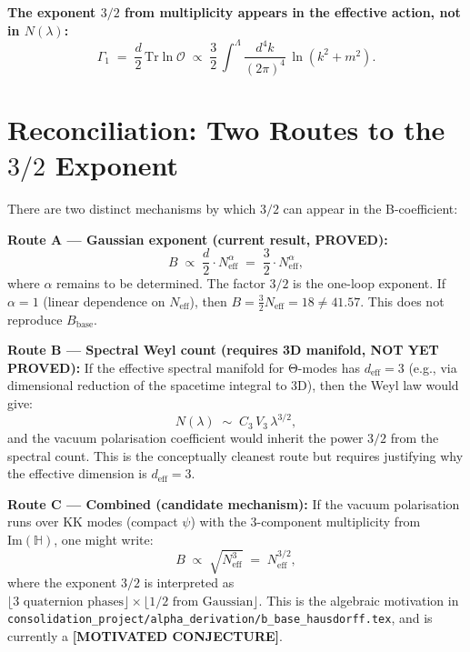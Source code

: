 \documentclass[11pt,a4paper]{article}
\theoremstyle{definition}
\theoremstyle{remark}
\begin{document}
\textbf{The exponent $3/2$ from multiplicity appears in the effective action, not in $N(\lambda)$:}
\begin{equation}
  \Gamma_1 \;=\; \frac{d}{2}\,\mathrm{Tr}\ln\hat{\mathcal{O}}
  \;\propto\; \frac{3}{2}\,\int^\Lambda \frac{d^4k}{(2\pi)^4}\,\ln(k^2 + m^2).
  \label{eq:Gamma1_counting}
\end{equation}

\section{Reconciliation: Two Routes to the $3/2$ Exponent}
\label{sec:reconciliation}

There are two distinct mechanisms by which $3/2$ can appear in
the B-coefficient:

\medskip

\noindent\textbf{Route A — Gaussian exponent (current result, PROVED):}
\begin{equation}
  B \;\propto\; \frac{d}{2} \cdot N_{\mathrm{eff}}^{\alpha}
  \;=\; \frac{3}{2} \cdot N_{\mathrm{eff}}^{\alpha},
  \label{eq:route_A}
\end{equation}
where $\alpha$ remains to be determined.
The factor $3/2$ is the one-loop exponent.
If $\alpha = 1$ (linear dependence on $N_{\mathrm{eff}}$),
then $B = \frac{3}{2} N_{\mathrm{eff}} = 18 \neq 41.57$.
This does not reproduce $B_{\mathrm{base}}$.

\medskip

\noindent\textbf{Route B — Spectral Weyl count (requires 3D manifold, NOT YET PROVED):}
If the effective spectral manifold for Θ-modes has $d_{\mathrm{eff}} = 3$
(e.g., via dimensional reduction of the spacetime integral to 3D),
then the Weyl law would give:
\begin{equation}
  N(\lambda) \;\sim\; C_3\,V_3\,\lambda^{3/2},
  \label{eq:route_B_weyl}
\end{equation}
and the vacuum polarisation coefficient would inherit the power $3/2$
from the spectral count.
This is the conceptually cleanest route but requires justifying why
the effective dimension is $d_{\mathrm{eff}} = 3$.

\medskip

\noindent\textbf{Route C — Combined (candidate mechanism):}
If the vacuum polarisation runs over KK modes (compact $\psi$) with
the 3-component multiplicity from $\mathrm{Im}(\mathbb{H})$, one might write:
\begin{equation}
  B \;\propto\; \sqrt{N_{\mathrm{eff}}^3}
  \;=\; N_{\mathrm{eff}}^{3/2},
  \label{eq:route_C}
\end{equation}
where the exponent $3/2$ is interpreted as
$\lfloor\text{3 quaternion phases}\rfloor \times \lfloor 1/2 \text{ from Gaussian}\rfloor$.
This is the algebraic motivation in
\texttt{consolidation\_project/alpha\_derivation/b\_base\_hausdorff.tex},
and is currently a \textbf{[MOTIVATED CONJECTURE]}.
\end{document}
